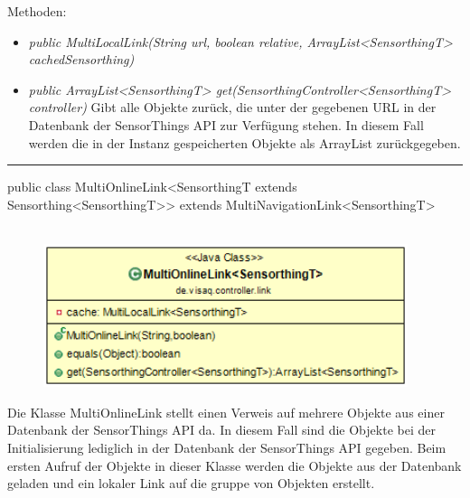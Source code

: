 Methoden:
\begin{itemize}
    \item \emph{public MultiLocalLink(String url, boolean relative, ArrayList<SensorthingT> cachedSensorthing)}
    \relativeDescription
    \item \emph{public ArrayList<SensorthingT> get(SensorthingController<SensorthingT> controller)}
    Gibt alle Objekte zurück, die unter der gegebenen URL in der Datenbank der \gls{SensorThings API} zur Verfügung stehen.
    In diesem Fall werden die in der Instanz gespeicherten Objekte als ArrayList zurückgegeben.
\end{itemize}
\clearpage %
\rule{\textwidth}{0.4pt}
public class MultiOnlineLink<SensorthingT extends Sensorthing<SensorthingT>> extends MultiNavigationLink<SensorthingT>
\\\\
\begin{minipage}{0.5\textwidth}
    \begin{figure}[H]
        {\centering\includegraphics[width=0.95\textwidth]{media/backend/controller/classes/MultiOnlineLink.png}}
    \end{figure}
    \end{minipage} \hfill
\begin{minipage}{0.5\textwidth}
    Die Klasse MultiOnlineLink stellt einen Verweis auf mehrere Objekte aus einer Datenbank der \gls{SensorThings API} da.
    In diesem Fall sind die Objekte bei der Initialisierung lediglich in der Datenbank der \gls{SensorThings API} gegeben.
    Beim ersten Aufruf der Objekte in dieser Klasse werden die Objekte aus der Datenbank geladen und ein lokaler Link auf die gruppe von Objekten erstellt.
\end{minipage}

